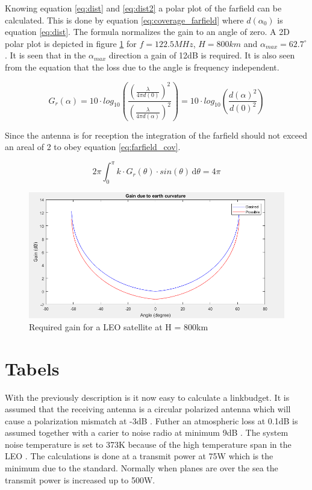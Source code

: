 Knowing equation \ref{eq:dist} and \ref{eq:dist2} a polar plot of the farfield can be calculated. This is done by equation \ref{eq:coverage_farfield} where $d(\alpha_0)$ is equation \ref{eq:dist}. The formula normalizes the gain to an angle of zero. A 2D polar plot 
is depicted in figure \ref{fig:sat_farfield_polar} for $f=122.5MHz$, $H=800km$ and $\alpha_{max} = 62.7^{\circ}$. It is seen that in the $\alpha_{max}$ direction a gain of 12dB is required. It is also seen from the equation that the loss due to the angle is frequency independent.  
  
\begin{equation}
G_r(\alpha) = 10\cdot log_{10}(\frac{(\frac{\lambda}{4 \pi d(0) })^2}{(\frac{\lambda}{4 \pi d(\alpha) })^2}) = 10\cdot log_{10}(\frac{d(\alpha)^2}{d(0)^2})
\end{equation}
\label{eq:coverage_farfield} 

Since the antenna is for reception the integration of the farfield should not exceed an areal of 2 to obey equation \ref{eq:farfield_cov}. 

\begin{equation}
2 \pi \int_0^\pi \! k \cdot G_r(\theta) \cdot sin(\theta) \, \mathrm{d}\theta = 4\pi
\end{equation}
\label{eq:farfield_cov}

\begin{figure}[H]
\centering 
\includegraphics[scale = 0.7]{figures/linkbudget/sat_farfield_matlab.png}
\caption{Required gain for a LEO satellite at H = 800km}
\label{fig:sat_farfield_polar}
\end{figure} 

\section{Tabels}
With the previously description is it now easy to calculate a linkbudget. It is assumed that the receiving antenna is a circular polarized antenna which will cause a polarization mismatch at -3dB \citep{Balanis2005}. Futher an atmospheric loss at 0.1dB is assumed together with a carier to noise radio at minimum 9dB \citep{itu2017}. The system noise temperature is set to 373K because of the high temperature span in the LEO \citep{FlyingLab}. The calculations is done at a transmit power at 75W which is the minimum due to the standard. Normally when planes are over the sea the transmit power is increased up to 500W.   
 
